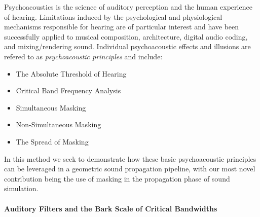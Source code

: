 Psychoacoustics is the science of auditory perception and the human experience of hearing.
Limitations induced by the psychological and physiological mechanisms responsible for hearing are of particular 
interest and have been successfully applied to musical composition, architecture, digital audio coding, and mixing/rendering 
sound.
Individual psychoacoustic effects and illusions are refered to as \emph{psychoacoustic principles} and include:

\begin{itemize}
\item The Absolute Threshold of Hearing
\item Critical Band Frequency Analysis
\item Simultaneous Masking
\item Non-Simultaneous Masking
\item The Spread of Masking
\end{itemize}

In this method we seek to demonstrate how these basic psychoacoustic principles can be leveraged in a geometric sound propagation 
pipeline, with our most novel contribution being the use of masking in the propagation phase of sound simulation.

\paragraph{Auditory Filters and the Bark Scale of Critical Bandwidths}

